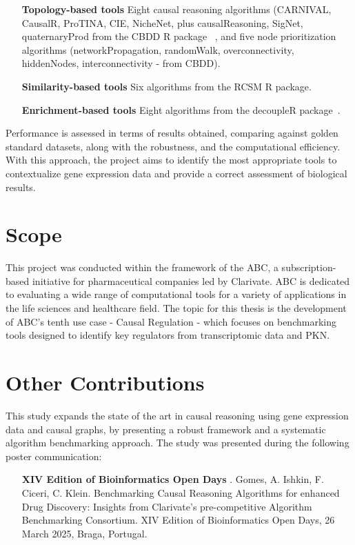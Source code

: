 \begin{enumerate}
\item[\textbf{Topology-based tools}] Eight causal reasoning algorithms (\gls{CARNIVAL}, CausalR, ProTINA, \gls{CIE}, NicheNet, plus causalReasoning, SigNet, quaternaryProd from the \gls{CBDD} \gls{R} package~\cite{RN36} , and five node prioritization algorithms (networkPropagation, randomWalk, overconnectivity, hiddenNodes, interconnectivity - from \gls{CBDD}). 
\item[\textbf{Similarity-based tools }] Six algorithms from the \gls{RCSM} R package.
\item[\textbf{Enrichment-based tools}] Eight algorithms from the decoupleR package~\cite{RN35}.
\end{enumerate}

Performance is assessed in terms of results obtained, comparing against golden standard datasets, along with the robustness, and the computational efficiency. 
With this approach, the project aims to identify the most appropriate tools to contextualize gene expression data and provide a correct assessment of biological results.

\section{Scope} %
\label{sec:scope}
This project was conducted within the framework of the \gls{ABC}, a subscription-based initiative for pharmaceutical companies led by Clarivate. \gls{ABC} is dedicated to evaluating a wide range of computational tools for a variety of applications in the life sciences and healthcare field. The topic for this thesis is the development of \gls{ABC}'s tenth use case - Causal Regulation - which focuses on benchmarking tools designed to identify key regulators from transcriptomic data and \gls{PKN}.

\section{Other Contributions} %
\label{sec:othercontributions}

This study expands the state of the art in causal reasoning using gene expression data and causal graphs, by presenting a robust framework and a systematic algorithm benchmarking approach. The study was presented during the following poster communication:
\begin{enumerate}
\item[\textbf{XIV Edition of Bioinformatics Open Days}] . Gomes, A. Ishkin, F. Ciceri, C. Klein. Benchmarking Causal Reasoning Algorithms for enhanced Drug Discovery: Insights from Clarivate's pre-competitive Algorithm Benchmarking Consortium. XIV Edition of Bioinformatics Open Days, 26 March 2025, Braga, Portugal.
\end{enumerate}


